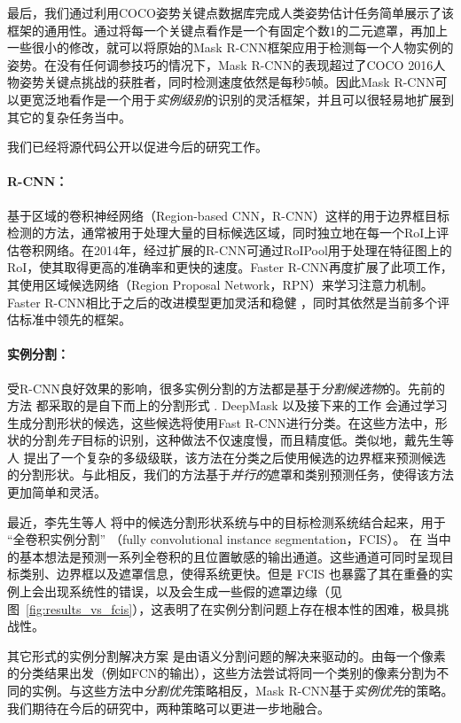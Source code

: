 最后，我们通过利用COCO姿势关键点数据库完成人类姿势估计任务简单展示了该框架的通用性。通过将每一个关键点看作是一个有固定个数1的二元遮罩，再加上一些很小的修改，就可以将原始的Mask R-CNN框架应用于检测每一个人物实例的姿势。在没有任何调参技巧的情况下，Mask R-CNN的表现超过了COCO 2016人物姿势关键点挑战的获胜者，同时检测速度依然是每秒5帧。因此Mask R-CNN可以更宽泛地看作是一个用于\emph{实例级别}的识别的灵活框架，并且可以很轻易地扩展到其它的复杂任务当中。

我们已经将源代码公开以促进今后的研究工作。


\paragraph{R-CNN：} 基于区域的卷积神经网络（Region-based CNN，R-CNN）这样的用于边界框目标检测的方法，通常被用于处理大量的目标候选区域，同时独立地在每一个RoI上评估卷积网络。在2014年，经过扩展的R-CNN可通过RoIPool用于处理在特征图上的RoI，使其取得更高的准确率和更快的速度。Faster R-CNN再度扩展了此项工作，其使用区域候选网络（Region Proposal Network，RPN）来学习注意力机制。Faster R-CNN相比于之后的改进模型更加灵活和稳健 ，同时其依然是当前多个评估标准中领先的框架。

\paragraph{实例分割：} 受R-CNN良好效果的影响，很多实例分割的方法都是基于\emph{分割候选物}的。先前的方法  都采取的是自下而上的分割形式 . DeepMask  以及接下来的工作  会通过学习生成分割形状的候选，这些候选将使用Fast R-CNN进行分类。在这些方法中，形状的分割\emph{先于}目标的识别，这种做法不仅速度慢，而且精度低。类似地，戴先生等人  提出了一个复杂的多级级联，该方法在分类之后使用候选的边界框来预测候选的分割形状。与此相反，我们的方法基于\emph{并行的}遮罩和类别预测任务，使得该方法更加简单和灵活。

最近，李先生等人  将中的候选分割形状系统与中的目标检测系统结合起来，用于 ``全卷积实例分割'' （fully convolutional instance segmentation，FCIS）。 在  当中的基本想法是预测一系列全卷积的且位置敏感的输出通道。这些通道可同时呈现目标类别、边界框以及遮罩信息，使得系统更快。但是 FCIS 也暴露了其在重叠的实例上会出现系统性的错误，以及会生成一些假的遮罩边缘（见图~\ref{fig:results_vs_fcis}），这表明了在实例分割问题上存在根本性的困难，极具挑战性。

其它形式的实例分割解决方案  是由语义分割问题的解决来驱动的。由每一个像素的分类结果出发（例如FCN的输出），这些方法尝试将同一个类别的像素分割为不同的实例。与这些方法中\emph{分割优先}策略相反，Mask R-CNN基于\emph{实例优先}的策略。我们期待在今后的研究中，两种策略可以更进一步地融合。

